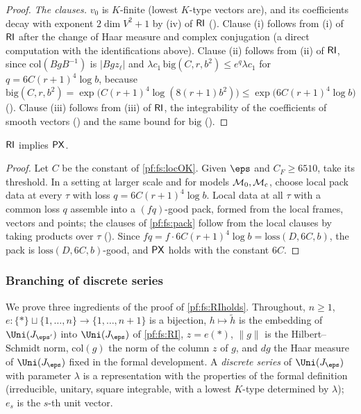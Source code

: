 \begin{proof}
\emph{The clauses.} $v_0$ is $K$-finite (lowest $K$-type vectors are), and its coefficients decay with exponent $2\dim V^2+1$ by (iv) of $\mathsf{RI}$
(). Clause (i) follows from (i) of $\mathsf{RI}$ after the change of Haar
measure and complex conjugation (a direct computation with the identifications above). Clause (ii) follows from (ii) of $\mathsf{RI}$, since $\mathrm{col}(BgB^{-1})$
is $|Bgz_\ell|$ and $\lambda c_1\,\mathrm{big}(C,r,b^2)\le e^q\lambda c_1$ for $q=6C(r+1)^4\log b$, because
\[
\mathrm{big}(C,r,b^2)=\exp\bigl(C(r+1)^4\log(8(r+1)b^2)\bigr)\le\exp\bigl(6C(r+1)^4\log b\bigr)
\]
(). Clause (iii) follows from (iii) of $\mathsf{RI}$, the integrability of the
coefficients of smooth vectors () and the same bound for $\mathrm{big}$
().
\end{proof}

\begin{proposition}\label{pf:fs:packEx}
$\mathsf{RI}$ implies $\mathsf{PX}$.
\end{proposition}

\begin{proof}
Let $C$ be the constant of \cref{pf:fs:locOK}. Given $\eps$ and $C_F\ge6510$, take its threshold. In a setting at larger scale and for models
$\mathcal M_0,\mathcal M_{\mathrm{c}}$, choose local pack data at every $\tau$ with loss $q=6C(r+1)^4\log b$. Local data at all $\tau$ with a common loss $q$
assemble into a $(fq)$-good pack, formed from the local frames, vectors and points; the clauses of \cref{pf:fs:pack} follow from the local
clauses by taking products over $\tau$ (). Since
$fq=f\cdot6C(r+1)^4\log b=\mathrm{loss}(D,6C,b)$, the pack is $\mathrm{loss}(D,6C,b)$-good, and $\mathsf{PX}$ holds with the constant $6C$.
\end{proof}

\subsubsection{Branching of discrete series}

We prove three ingredients of the proof of \cref{pf:fs:RIholds}. Throughout, $n\ge1$, $e\colon\{\ast\}\sqcup\{1,\dots,n\}\to\{1,\dots,n+1\}$ is a
bijection, $h\mapsto\tilde h$ is the embedding of $\Uni(J_{\eps'})$ into $\Uni(J_\eps)$ of \cref{pf:fs:RI}, $z=e(\ast)$, $\|g\|$ is the
Hilbert--Schmidt norm, $\mathrm{col}(g)$ the norm of the column $z$ of $g$, and $dg$ the Haar measure of $\Uni(J_\eps)$ fixed in the formal
development. A \emph{discrete series} of $\Uni(J_\eps)$ with parameter $\lambda$ is a representation with the properties of the formal
definition (irreducible, unitary, square integrable, with a lowest $K$-type determined by $\lambda$); $e_s$ is the $s$-th unit vector.

